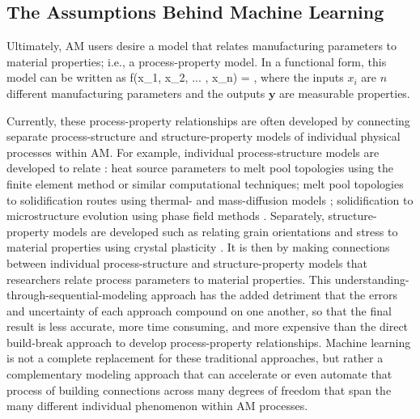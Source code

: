 \subsection{The Assumptions Behind Machine Learning}
Ultimately, AM users desire a model that relates manufacturing parameters to material properties; i.e., a process-property model. In a functional form, this model can be written as
\eqn
f(x_1, x_2, ... , x_n) = ,
\label{fundamentalgoal}
\equ
where the inputs $x_i$ are $n$ different manufacturing parameters and the outputs $\mathbf{y}$ are measurable properties.

Currently, these process-property relationships are often developed by connecting separate process-structure and structure-property models of individual physical processes within AM.
For example, individual process-structure models are developed to relate : heat source parameters to melt pool topologies \cite{Khairallah2016} using the finite element method or similar computational techniques; melt pool topologies to solidification routes using thermal- and mass-diffusion models  \cite{Tan2011}; solidification to microstructure evolution using phase field methods \cite{Kundin2015}.
Separately, structure-property models are developed such as relating grain orientations and stress to material properties using crystal plasticity \cite{Pal2014}.
It is then by making connections between individual process-structure and structure-property models that researchers relate process parameters to material properties.
This understanding-through-sequential-modeling approach has the added detriment that the errors and uncertainty of each approach compound on one another, so that the final result is less accurate, more time consuming, and more expensive than the direct build-break approach to develop process-property relationships.
Machine learning is not a complete replacement for these traditional approaches, but rather a complementary modeling approach that can accelerate or even automate that process of building connections across many degrees of freedom that span the many different individual phenomenon within AM processes.

%
%


